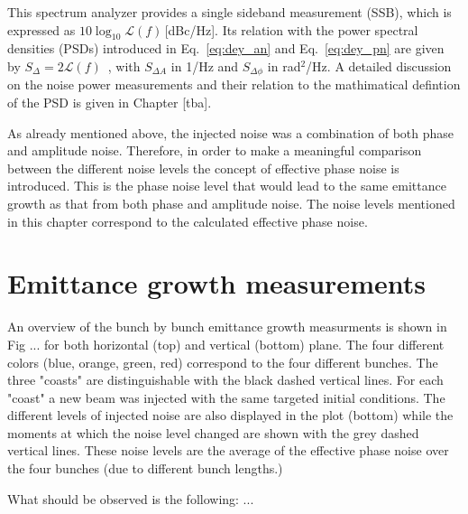\begin{sloppypar} %
This spectrum analyzer provides a single sideband measurement (SSB), which is expressed as $10\log_{10}\mathcal{L}(f)$\,[dBc/Hz]. Its relation with the power spectral densities (PSDs) introduced in Eq.~\eqref{eq:dey_an} and Eq.~\eqref{eq:dey_pn} are given by $S_\Delta = 2\mathcal{L}(f)$~\cite{IEEE:4797525}, with $S_{\Delta A}$ in 1/Hz and $S_{\Delta\phi}$ in rad$^2$/Hz. A detailed discussion on the noise power measurements and their relation to the mathimatical defintion of the PSD is given in Chapter [tba].

As already mentioned above, the injected noise was a combination of both phase and amplitude noise. Therefore, in order to make a meaningful comparison between the different noise levels the concept of effective phase noise is introduced. This is the phase noise level that would lead to
the same emittance growth as that from both phase and
amplitude noise. The noise levels mentioned in this chapter correspond to the calculated effective phase noise.
\end{sloppypar} 



\section{Emittance growth measurements}\label{sec:EmitGrowth_measurements}

An overview of the bunch by bunch emittance growth measurments is shown in Fig ... for both horizontal (top) and vertical (bottom) plane. The four different colors (blue, orange, green, red) correspond to the four different bunches. The three "coasts" are distinguishable with the black dashed vertical lines. For each "coast" a new beam was injected with the same targeted initial conditions. The different levels of injected noise are also displayed in the plot (bottom) while the moments at which the noise level changed are shown with the grey dashed vertical lines. These noise levels are the average of the effective phase noise over the four bunches (due to different bunch lengths.)


What should be observed is the following: ...



